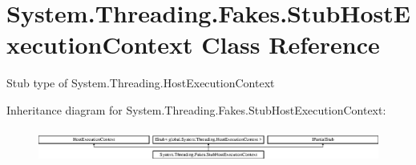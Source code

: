 \hypertarget{class_system_1_1_threading_1_1_fakes_1_1_stub_host_execution_context}{\section{System.\-Threading.\-Fakes.\-Stub\-Host\-Execution\-Context Class Reference}
\label{class_system_1_1_threading_1_1_fakes_1_1_stub_host_execution_context}
}


Stub type of System.\-Threading.\-Host\-Execution\-Context 


Inheritance diagram for System.\-Threading.\-Fakes.\-Stub\-Host\-Execution\-Context\-:\begin{figure}[H]
\begin{center}
\leavevmode
\includegraphics[height=1.107814cm]{class_system_1_1_threading_1_1_fakes_1_1_stub_host_execution_context}
\end{center}
\end{figure}
